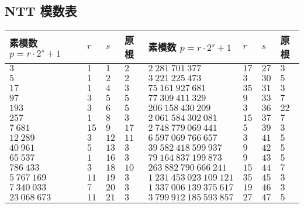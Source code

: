 \subsection{NTT 模数表}

\begin{tabular}{llll|llll}
    \hline
    素模数 \(p=r\cdot 2^s+1\)     & \(r\)   & \(s\)  & 原根     & 素模数 \(p=r\cdot 2^s+1\)        & \(r\)  & \(s\)  & 原根     \\
    \hline
    \(3\)                      & \(1\)   & \(1\)  & \(2\)  & \(2~281~701~377\)             & \(17\) & \(27\) & \(3\)  \\
    \(5\)                      & \(1\)   & \(2\)  & \(2\)  & \(3~221~225~473\)             & \(3\)  & \(30\) & \(5\)  \\
    \(17\)                     & \(1\)   & \(4\)  & \(3\)  & \(75~161~927~681\)            & \(35\) & \(31\) & \(3\)  \\
    \(97\)                     & \(3\)   & \(5\)  & \(5\)  & \(77~309~411~329\)            & \(9\)  & \(33\) & \(7\)  \\
    \(193\)                    & \(3\)   & \(6\)  & \(5\)  & \(206~158~430~209\)           & \(3\)  & \(36\) & \(22\) \\
    \(257\)                    & \(1\)   & \(8\)  & \(3\)  & \(2~061~584~302~081\)         & \(15\) & \(37\) & \(7\)  \\
    \(7~681\)                  & \(15\)  & \(9\)  & \(17\) & \(2~748~779~069~441\)         & \(5\)  & \(39\) & \(3\)  \\
    \(12~289\)                 & \(3\)   & \(12\) & \(11\) & \(6~597~069~766~657\)         & \(3\)  & \(41\) & \(5\)  \\
    \(40~961\)                 & \(5\)   & \(13\) & \(3\)  & \(39~582~418~599~937\)        & \(9\)  & \(42\) & \(5\)  \\
    \(65~537\)                 & \(1\)   & \(16\) & \(3\)  & \(79~164~837~199~873\)        & \(9\)  & \(43\) & \(5\)  \\
    \(786~433\)                & \(3\)   & \(18\) & \(10\) & \(263~882~790~666~241\)       & \(15\) & \(44\) & \(7\)  \\
    \(5~767~169\)              & \(11\)  & \(19\) & \(3\)  & \(1~231~453~023~109~121\)     & \(35\) & \(45\) & \(3\)  \\
    \(7~340~033\)              & \(7\)   & \(20\) & \(3\)  & \(1~337~006~139~375~617\)     & \(19\) & \(46\) & \(3\)  \\
    \(23~068~673\)             & \(11\)  & \(21\) & \(3\)  & \(3~799~912~185~593~857\)     & \(27\) & \(47\) & \(5\)  \\

\end{tabular}
